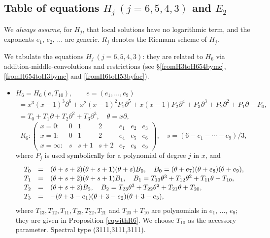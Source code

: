 \documentclass[a4paper,12pt]{article}
\theoremstyle{definition}
\theoremstyle{remark}
\numberwithin{equation}{section} %
\newcommand{\blue}[1]{\textcolor{black}{#1}}
\begin{document}
\subsection{Table of equations $H_j\ (j=6,5,4,3)$ and $E_2$}\label{TheTenTable}
We {\it always assume}, for $H_j$,  that local solutions
have no logarithmic term, and the exponents $e_1$, $e_2$, $\dots$ are generic. $R_j$ denotes the Riemann scheme of $H_j$.

We tabulate the equations $H_j\ (j=6,5,4,3)$: they are related to $H_6$ via addition-middle-convolutions and restrictions (see \S \ref{fromH3toH654bymc}, \ref{fromH654toH3bymc} and \ref{fromH6toH53byfac}).
\begin{itemize}[leftmargin=*] \setlength{\itemsep}{5pt}
\item$H_6=H_6(e,T_{10}),\qquad e=(e_1, \dots, e_9)$
  $$\begin{array}{l}=x^3(x-1)^3\partial^6+x^2(x-1)^2P_1\partial^5+x(x-1)P_2\partial^4+P_3\partial^3+P_2\partial^2+P_1\partial+P_0,\\[2mm]
     = T_0+T_1\partial+T_2\partial^2+T_3\partial^3,\quad \theta=x\partial,\end{array}$$
  \[R_6:\left(\begin{array}{lcccccc}
    x=0:&0&1&2&e_1&e_2&e_3\\
    x=1:&0&1&2&e_4&e_5&e_6\\
    x=\infty:&s&s+1&s+2&e_7&e_8&e_9\end{array}\right),
    \quad  s=(6-e_1-\cdots-e_9)/3,
    \]
    where $P_j$ \blue{is used symbolically} for a polynomial of degree $j$ in $x$,    and
\[\def\arraystretch{1.1}
\begin{array}{lcl}
 T_0&=&(\theta+s+2)(\theta+s+1)(\theta+s)B_0,\quad B_0=(\theta+e_7)(\theta+e_8)(\theta+e_9),\\
 T_1&=&(\theta+s+2)(\theta+s+1)B_1,\quad B_1=T_{13}\theta^3+T_{12}\theta^2+T_{11}\theta+T_{10},\\
 T_2&=&(\theta+s+2)B_2,\quad B_2=T_{23}\theta^3+T_{22}\theta^2+T_{21}\theta+T_{20},\\
 T_3&=&-(\theta+3-e_1)(\theta+3-e_2)(\theta+3-e_3),
 \end{array}
 \] %
 where $T_{13},T_{12},T_{11},T_{23},T_{22},T_{21}$ and $T_{20}+T_{10}$ are polynomials in $e_1$, $\dots$, $e_9$; they are given in Proposition \ref{eqwithR6}. We choose $T_{10}$ as the accessory parameter. Spectral type (3111,3111,3111).


\end{itemize}
\end{document}
